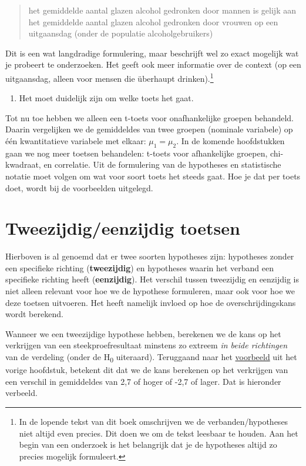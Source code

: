 \documentclass[
  letterpaper,
  DIV=11,
  numbers=noendperiod]{scrreprt}
\providecommand{\tightlist}{%
  \setlength{\itemsep}{0pt}\setlength{\parskip}{0pt}}
\begin{document}
\begin{quote}
het gemiddelde aantal glazen alcohol gedronken door mannen is gelijk aan
het gemiddelde aantal glazen alcohol gedronken door vrouwen op een
uitgaansdag (onder de populatie alcoholgebruikers)
\end{quote}

Dit is een wat langdradige formulering, maar beschrijft wel zo exact
mogelijk wat je probeert te onderzoeken. Het geeft ook meer informatie
over de context (op een uitgaansdag, alleen voor mensen die überhaupt
drinken).\footnote{In de lopende tekst van dit boek omschrijven we de
  verbanden/hypotheses niet altijd even precies. Dit doen we om de tekst
  leesbaar te houden. Aan het begin van een onderzoek is het belangrijk
  dat je de hypotheses altijd zo precies mogelijk formuleert.}

\begin{enumerate}
\def\labelenumi{\arabic{enumi}.}
\setcounter{enumi}{4}
\tightlist
\item
  Het moet duidelijk zijn om welke toets het gaat.
\end{enumerate}

Tot nu toe hebben we alleen een t-toets voor onafhankelijke groepen
behandeld. Daarin vergelijken we de gemiddeldes van twee groepen
(nominale variabele) op één kwantitatieve variabele met elkaar:
\(\mu_1 =\mu_2\). In de komende hoofdstukken gaan we nog meer toetsen
behandelen: t-toets voor afhankelijke groepen, chi-kwadraat, en
correlatie. Uit de formulering van de hypotheses en statistische notatie
moet volgen om wat voor soort toets het steeds gaat. Hoe je dat per
toets doet, wordt bij de voorbeelden uitgelegd.

\section{Tweezijdig/eenzijdig
toetsen}\label{tweezijdigeenzijdig-toetsen}

Hierboven is al genoemd dat er twee soorten hypotheses zijn: hypotheses
zonder een specifieke richting (\textbf{tweezijdig}) en hypotheses
waarin het verband een specifieke richting heeft (\textbf{eenzijdig}).
Het verschil tussen tweezijdig en eenzijdig is niet alleen relevant voor
hoe we de hypothese formuleren, maar ook voor hoe we deze toetsen
uitvoeren. Het heeft namelijk invloed op hoe de overschrijdingskans
wordt berekend.

Wanneer we een tweezijdige hypothese hebben, berekenen we de kans op het
verkrijgen van een steekproefresultaat minstens zo extreem \emph{in
beide richtingen} van de verdeling (onder de H\textsubscript{0}
uiteraard). Teruggaand naar het
\hyperref[sec-statistischesignificantie]{voorbeeld} uit het vorige
hoofdstuk, betekent dit dat we de kans berekenen op het verkrijgen van
een verschil in gemiddeldes van 2,7 of hoger of -2,7 of lager. Dat is
hieronder verbeeld.
\end{document}

